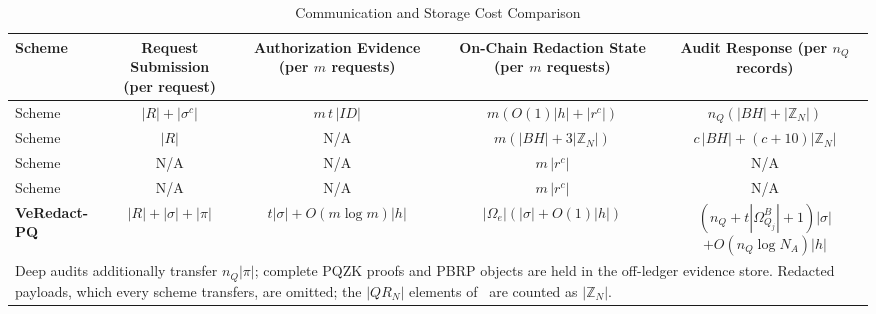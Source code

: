 \documentclass[lettersize,journal]{IEEEtran}
\begin{document}
    \begin{table}[t]
    \centering
    \caption{Communication and Storage Cost Comparison}
    \label{tab:comm-cost}
    \footnotesize
    \renewcommand{\arraystretch}{1.25}
    \setlength{\tabcolsep}{4pt}
    \begin{tabular}{lcccc}
    \toprule
    \textbf{Scheme} &
    \makecell{\textbf{Request Submission}\\\textbf{(per request)}} &
    \makecell{\textbf{Authorization Evidence}\\\textbf{(per $m$ requests)}} &
    \makecell{\textbf{On-Chain Redaction State}\\\textbf{(per $m$ requests)}} &
    \makecell{\textbf{Audit Response}\\\textbf{(per $n_Q$ records)}} \\
    \midrule
    Scheme~\cite{ref1}
    & $|R|+|\sigma^{c}|$ & $m\,t\,|ID|$ & $m(O(1)|h|+|r^{c}|)$ & $n_Q(|BH|+|\mathbb{Z}_N|)$ \\
    Scheme~\cite{ref13}
    & $|R|$ & N/A & $m(|BH|+3|\mathbb{Z}_N|)$ & $c\,|BH|+(c+10)|\mathbb{Z}_N|$ \\
    Scheme~\cite{ref27}
    & N/A & N/A & $m\,|r^{c}|$ & N/A \\
    Scheme~\cite{ref34}
    & N/A & N/A & $m\,|r^{c}|$ & N/A \\
    \midrule
    \textbf{VeRedact-PQ}
    & $|R|+|\sigma|+|\pi|$
    & $t|\sigma|+O(m\log m)|h|$
    & $|\Omega_e|(|\sigma|+O(1)|h|)$
    & \makecell{$(n_Q+t|\Omega_{Q_j}^B|+1)|\sigma|$\\$+O(n_Q\log N_A)|h|$} \\
    \bottomrule
    \multicolumn{5}{p{0.96\textwidth}}{\footnotesize Deep audits additionally transfer $n_Q|\pi|$; complete PQZK proofs and PBRP objects are held in the off-ledger evidence store.
    Redacted payloads, which every scheme transfers, are omitted; the $|QR_N|$ elements of~\cite{ref13} are counted as $|\mathbb{Z}_N|$.}
    \end{tabular}
    \end{table}
    
\end{document}
